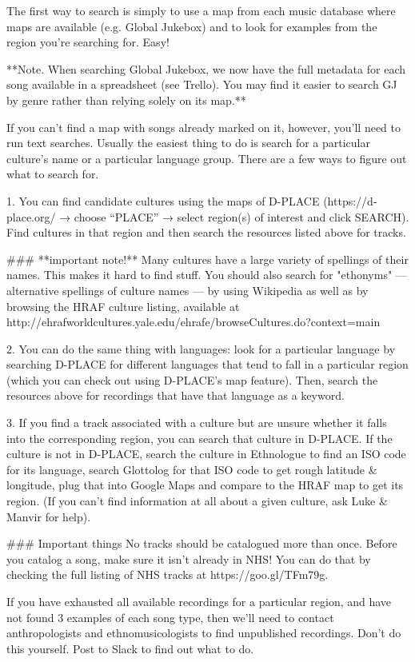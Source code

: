 The first way to search is simply to use a map from each music database where maps are available (e.g. Global Jukebox) and to look for examples from the region you're searching for. Easy!

**Note. When searching Global Jukebox, we now have the full metadata for each song available in a spreadsheet (see Trello). You may find it easier to search GJ by genre rather than relying solely on its map.**

If you can't find a map with songs already marked on it, however, you'll need to run text searches. Usually the easiest thing to do is search for a particular culture's name or a particular language group. There are a few ways to figure out what to search for.

1. You can find candidate cultures using the maps of D-PLACE (https://d-place.org/ → choose “PLACE” → select region(s) of interest and click SEARCH). Find cultures in that region and then search the resources listed above for tracks.

### **important note!**
Many cultures have a large variety of spellings of their names. This makes it hard to find stuff. You should also search for "ethonyms" — alternative spellings of culture names — by using Wikipedia as well as by browsing the HRAF culture listing, available at http://ehrafworldcultures.yale.edu/ehrafe/browseCultures.do?context=main

2. You can do the same thing with languages: look for a particular language by searching D-PLACE for different languages that tend to fall in a particular region (which you can check out using D-PLACE's map feature). Then, search the resources above for recordings that have that language as a keyword.

3. If you find a track associated with a culture but are unsure whether it falls into the corresponding region, you can search that culture in D-PLACE. If the culture is not in D-PLACE, search the culture in Ethnologue to find an ISO code for its language, search Glottolog for that ISO code to get rough latitude & longitude, plug that into Google Maps and compare to the HRAF map to get its region. (If you can't find information at all about a given culture, ask Luke & Manvir for help).

### Important things
No tracks should be catalogued more than once. Before you catalog a song, make sure it isn't already in NHS! You can do that by checking the full listing of NHS tracks at https://goo.gl/TFm79g.

If you have exhausted all available recordings for a particular region, and have not found 3 examples of each song type, then we'll need to contact anthropologists and ethnomusicologists to find unpublished recordings. Don't do this yourself. Post to Slack to find out what to do.

